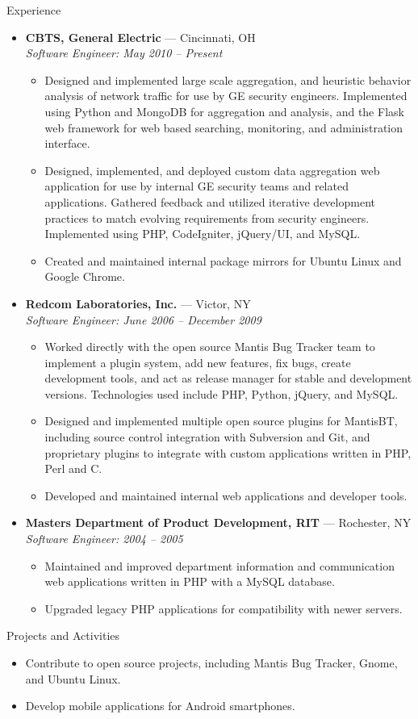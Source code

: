 \documentclass[11pt,oneside]{article}
\newenvironment{ressection}[1]{
	\vspace{8pt}
	{\fontfamily{phv}\selectfont\Large#1}
	\begin{itemize}
	\vspace{3pt}
}{
	\end{itemize}
}
\newcommand{\resitem}[1]{
	\vspace{-4pt}
	\item \begin{flushleft} #1 \end{flushleft}
}
\newcommand{\ressubitem}[1]{
	\vspace{-1pt}
	\item \begin{flushleft} #1 \end{flushleft}
}
\newcommand{\resbigitem}[3]{
	\vspace{-5pt}
	\item
	\textbf{#1} --- #2 \\
	\textit{#3}
}
\newenvironment{ressubsec}[3]{
	\resbigitem{#1}{#2}{#3}
	\vspace{-2pt}
	\begin{itemize}
}{
	\end{itemize}
}
\begin{document}
\begin{ressection}{Experience}

	\begin{ressubsec}{CBTS, General Electric}{Cincinnati, OH}
	{Software Engineer: May 2010 -- Present}
		\ressubitem{Designed and implemented large scale aggregation, and heuristic behavior analysis
		of network traffic for use by GE security engineers.
		Implemented using Python and MongoDB for aggregation and analysis, and the Flask web framework
		for web based searching, monitoring, and administration interface.}
		\ressubitem{Designed, implemented, and deployed custom data aggregation web application
		for use by internal GE security teams and related applications.  Gathered feedback and utilized
		iterative development practices to match evolving requirements from security engineers.
		Implemented using PHP, CodeIgniter, jQuery/UI, and MySQL.}
		\ressubitem{Created and maintained internal package mirrors for Ubuntu Linux and Google Chrome.}
	\end{ressubsec}

	\begin{ressubsec}{Redcom Laboratories, Inc.}{Victor, NY}
	{Software Engineer: June 2006 -- December 2009}
		\ressubitem{Worked directly with the open source Mantis Bug Tracker team to implement
		a plugin system, add new features, fix bugs, create development tools, and act as release
		manager for stable and development versions.  Technologies used include PHP, Python,
		jQuery, and MySQL.}
		\ressubitem{Designed and implemented multiple open source plugins for MantisBT, including
		source control integration with Subversion and Git, and proprietary plugins to integrate
		with custom applications written in PHP, Perl and C.}
		\ressubitem{Developed and maintained internal web applications and developer tools.}
	\end{ressubsec}

	\begin{ressubsec}{Masters Department of Product Development, RIT}{Rochester, NY}
	{Software Engineer: 2004 -- 2005}
		\ressubitem{Maintained and improved department information and communication web
		applications written in PHP with a MySQL database.}
		\ressubitem{Upgraded legacy PHP applications for compatibility with newer servers.}
	\end{ressubsec}

\end{ressection}


\begin{ressection}{Projects and Activities}

	\resitem{Contribute to open source projects, including Mantis Bug Tracker, Gnome, and Ubuntu Linux.}

	\resitem{Develop mobile applications for Android smartphones.}



\end{ressection}
\end{document}
